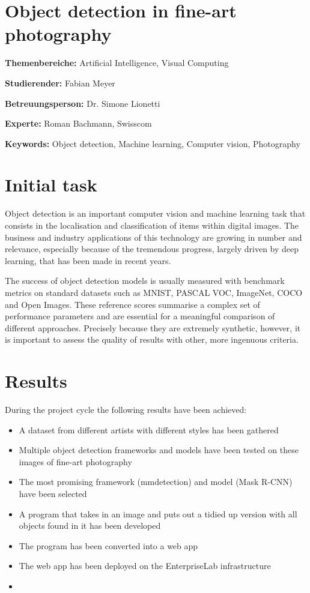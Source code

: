 \documentclass[a4paper,10pt,hidelinks]{scrartcl}
\begin{document}
\section*{\fontsize{18}{20}\selectfont Object detection in fine-art photography}
\thispagestyle{firstpage}

\textbf{Themenbereiche:} \tabto{4cm} Artificial Intelligence, Visual Computing

\noindent
\textbf{Studierender:} \tabto{4cm} Fabian Meyer

\noindent
\textbf{Betreuungsperson:} \tabto{4cm} Dr. Simone Lionetti

\noindent
\textbf{Experte:} \tabto{4cm} Roman Bachmann, Swisscom

\noindent
\textbf{Keywords:} \tabto{4cm} Object detection, Machine learning, Computer vision, Photography

\section{\fontsize{14}{16}\selectfont Initial task}

Object detection is an important computer vision and machine learning task that consists in the localisation and classification of items within digital images. The business and industry applications of this technology are growing in number and relevance, especially because of the tremendous progress, largely driven by deep learning, that has been made in recent years.

The success of object detection models is usually measured with benchmark metrics on standard datasets such as MNIST, PASCAL VOC, ImageNet, COCO and Open Images. These reference scores summarise a complex set of performance parameters and are essential for a meaningful comparison of different approaches. Precisely because they are extremely synthetic, however, it is important to assess the quality of results with other, more ingenuous criteria.

\section{\fontsize{14}{16}\selectfont Results}

During the project cycle the following results have been achieved:

\begin{itemize}
	\item A dataset from different artists with different styles has been gathered
	\item Multiple object detection frameworks and models have been tested on these images of fine-art photography
	\item The most promising framework (mmdetection) and model (Mask R-CNN) have been selected
	\item A program that takes in an image and puts out a tidied up version with all objects found in it has been developed
	\item The program has been converted into a web app
	\item The web app has been deployed on the EnterpriseLab infrastructure
	\item %
\end{itemize}
\end{document}
